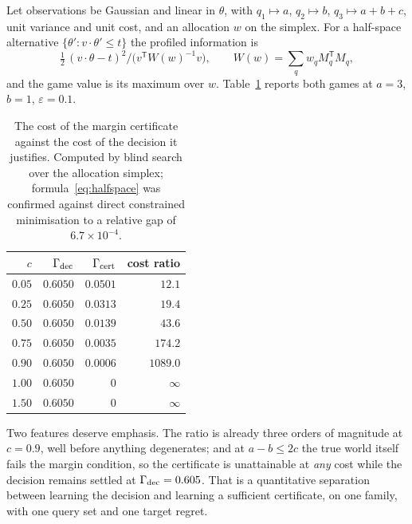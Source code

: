 Let observations be Gaussian and linear in $\theta$, with $q_{1}\mapsto a$,
$q_{2}\mapsto b$, $q_{3}\mapsto a+b+c$, unit variance and unit cost, and an allocation $w$
on the simplex. For a half-space alternative $\{\theta':v\cdot\theta'\le t\}$ the profiled
information is
\begin{equation}
\tfrac12\,(v\cdot\theta-t)^{2}\big/\bigl(v^{\mathsf T}W(w)^{-1}v\bigr),\qquad
W(w)=\textstyle\sum_{q}w_{q}M_{q}^{\mathsf T}M_{q},
\label{eq:halfspace}
\end{equation}
and the game value is its maximum over $w$. Table~\ref{tab:oraclegap} reports both games
at $a=3$, $b=1$, $\varepsilon=0.1$.

\begin{table}[t]
\caption{The cost of the margin certificate against the cost of the decision it justifies.
Computed by blind search over the allocation simplex; formula~\eqref{eq:halfspace} was
confirmed against direct constrained minimisation to a relative gap of $6.7\times10^{-4}$.
\NUM{}}
\label{tab:oraclegap}
\centering
\footnotesize
\begin{tabular}{@{}rrrr@{}}
\toprule
$c$ & $\Gamma_{\rm dec}$ & $\Gamma_{\rm cert}$ & cost ratio \\
\midrule
$0.05$ & $0.6050$ & $0.0501$ & $12.1$ \\
$0.25$ & $0.6050$ & $0.0313$ & $19.4$ \\
$0.50$ & $0.6050$ & $0.0139$ & $43.6$ \\
$0.75$ & $0.6050$ & $0.0035$ & $174.2$ \\
$0.90$ & $0.6050$ & $0.0006$ & $1089.0$ \\
$1.00$ & $0.6050$ & $0$ & $\infty$ \\
$1.50$ & $0.6050$ & $0$ & $\infty$ \\
\bottomrule
\end{tabular}
\end{table}

Two features deserve emphasis. The ratio is already three orders of magnitude at $c=0.9$,
well before anything degenerates; and at $a-b\le2c$ the true world itself fails the margin
condition, so the certificate is unattainable at \emph{any} cost while the decision remains
settled at $\Gamma_{\rm dec}=0.605$. That is a quantitative separation between learning the
decision and learning a sufficient certificate, on one family, with one query set and one
target regret.


